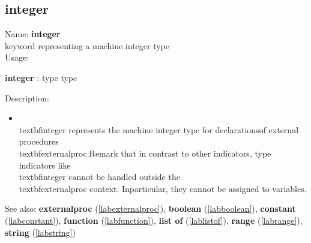 \subsection{integer}
\label{labinteger}
\noindent Name: \textbf{integer}\\
keyword representing a machine integer type \\
\noindent Usage: 
\begin{center}
\textbf{integer} : \textsf{type type}\\
\end{center}
\noindent Description: \begin{itemize}

\item \\textbf{integer} represents the machine integer type for declarations\n   of external procedures \\textbf{externalproc}.\n    \n   Remark that in contrast to other indicators, type indicators like\n   \\textbf{integer} cannot be handled outside the \\textbf{externalproc} context.  In\n   particular, they cannot be assigned to variables.\n\end{itemize}
See also: \textbf{externalproc} (\ref{labexternalproc}), \textbf{boolean} (\ref{labboolean}), \textbf{constant} (\ref{labconstant}), \textbf{function} (\ref{labfunction}), \textbf{list of} (\ref{lablistof}), \textbf{range} (\ref{labrange}), \textbf{string} (\ref{labstring})
